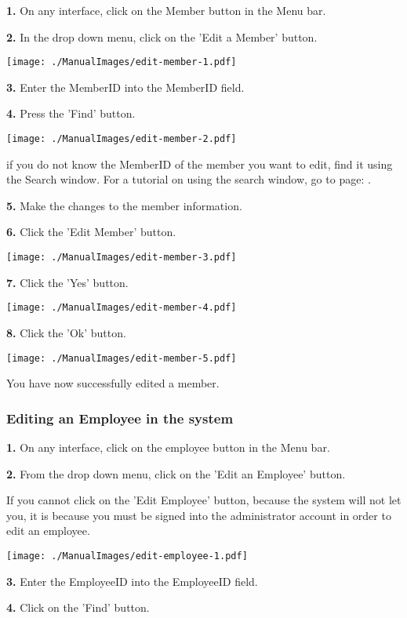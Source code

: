\textbf{1.} On any interface, click on the Member button in the Menu bar.

\textbf{2.} In the drop down menu, click on the 'Edit a Member' button.

\texttt{[image: ./ManualImages/edit-member-1.pdf]}

\textbf{3.} Enter the MemberID into the MemberID field. 

\textbf{4.} Press the 'Find' button.

\texttt{[image: ./ManualImages/edit-member-2.pdf]}

if you do not know the MemberID of the member you want to edit, find it using the Search window. For a tutorial on using the search window, go to page: . 

\textbf{5.} Make the changes to the member information.

\textbf{6.}  Click the 'Edit Member' button.

\texttt{[image: ./ManualImages/edit-member-3.pdf]}

\textbf{7.}  Click the 'Yes' button.

\texttt{[image: ./ManualImages/edit-member-4.pdf]}

\textbf{8.} Click the 'Ok' button.

\texttt{[image: ./ManualImages/edit-member-5.pdf]}

You have now successfully edited a member.

\pagebreak
\subsubsection{Editing an Employee in the system}
\label{fig:Editing an Employee in the system}

\textbf{1.} On any interface, click on the employee button in the Menu bar.

\textbf{2.} From the drop down menu, click on the 'Edit an Employee' button.

If you cannot click on the 'Edit Employee' button, because the system will not let you, it is because you must be signed into the administrator account in order to edit an employee.

\texttt{[image: ./ManualImages/edit-employee-1.pdf]}

\textbf{3.} Enter the EmployeeID into the EmployeeID field.

\textbf{4.} Click on the 'Find' button.

